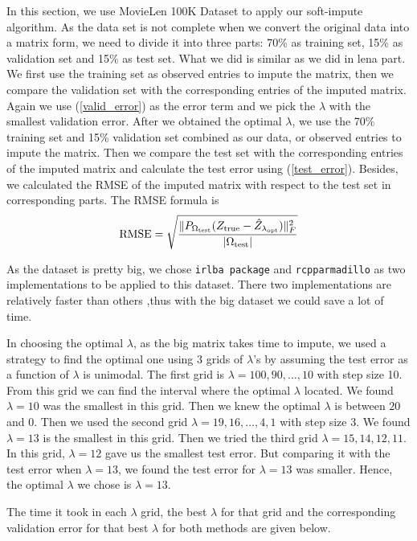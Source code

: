 \documentclass{article}
\begin{document}
	In this section, we use MovieLen 100K Dataset to apply our soft-impute algorithm. As the data set is not complete when we convert the original data into a matrix form, we need to divide it into three parts: 70\% as training set, 15\% as validation set and 15\% as test set. What we did is similar as we did in lena part. We first use the training set as observed entries to impute the matrix, then we compare the validation set with the corresponding entries of the imputed matrix. Again we use (\ref{valid_error}) as the error term and we pick the $\lambda$ with the smallest validation error. After we obtained the optimal $\lambda$, we use the 70\% training set and 15\% validation set combined as our data, or observed entries to impute the matrix. Then we compare the test set with the corresponding entries of the imputed matrix and calculate the test error using (\ref{test_error}). Besides, we calculated the RMSE of the imputed matrix with respect to the test set in corresponding parts. The RMSE formula is
	\begin{equation}
	\textrm{RMSE} = \sqrt{\frac{\|P_{\Omega_{\rm test}}(Z_{\rm true} - \hat{Z}_{\lambda_{\rm opt}})\|_{F}^2}{|\Omega_{\rm test}|}}
	\end{equation}

	As the dataset is pretty big, we chose \verb|irlba package| and \verb|rcpparmadillo| as two implementations to be applied to this dataset. There two implementations are relatively faster than others ,thus with the big dataset we could save a lot of time. 

	In choosing the optimal $\lambda$, as the big matrix takes time to impute, we used a strategy to find the optimal one using 3 grids of $\lambda$'s by assuming the test error as a function of $\lambda$ is unimodal. The first grid is $\lambda = 100, 90, \ldots, 10$ with step size 10. From this grid we can find the interval where the optimal $\lambda$ located. We found $\lambda  = 10$ was the smallest in this grid. Then we knew the optimal $\lambda$ is between $20$ and $0$. Then we used the second grid $\lambda = 19, 16, \ldots, 4, 1$ with step size 3. We found $\lambda = 13$ is the smallest in this grid. Then we tried the third grid $\lambda = 15, 14, 12, 11$. In this grid, $\lambda = 12$ gave us the smallest test error. But comparing it with the test error when $\lambda = 13$, we found the test error for $\lambda =13$ was smaller. Hence, the optimal $\lambda$ we chose is $\lambda = 13$. 

	The time it took in each $\lambda$ grid, the best $\lambda$ for that grid and the corresponding validation error for that best $\lambda$ for both methods are given below.
\end{document}
